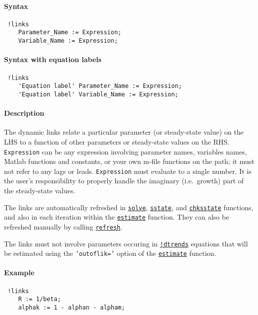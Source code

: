 


	\paragraph{Syntax}
 
 \begin{verbatim}
 !links
    Parameter_Name := Expression;
    Variable_Name := Expression;
 \end{verbatim}
 
 \paragraph{Syntax with equation labels}
 
 \begin{verbatim}
 !links
    'Equation label' Parameter_Name := Expression;
    'Equation label' Variable_Name := Expression;
 \end{verbatim}
 
 \paragraph{Description}
 
 The dynamic links relate a particular parameter (or steady-state value)
 on the LHS to a function of other parameters or steady-state values on
 the RHS. \texttt{Expression} can be any expression involving parameter
 names, variables names, Matlab functions and constants, or your own
 m-file functions on the path; it must not refer to any lags or leads.
 \texttt{Expression} must evaluate to a single number. It is the user's
 responsibility to properly handle the imaginary (i.e.~growth) part of
 the steady-state values.
 
 The links are automatically refreshed in
 \href{model/solve}{\texttt{solve}},
 \href{model/sstate}{\texttt{sstate}}, and
 \href{model/chksstate}{\texttt{chksstate}} functions, and also in each
 iteration within the \href{model/estimate}{\texttt{estimate}} function.
 They can also be refreshed manually by calling
 \href{model/refresh}{\texttt{refresh}}.
 
 The links must not involve parameters occuring in
 \href{modellang/dtrends}{\texttt{!dtrends}} equations that will be
 estimated using the \texttt{'outoflik='} option of the
 \href{model/estimate}{\texttt{estimate}} function.
 
 \paragraph{Example}
 
 \begin{verbatim}
 !links
    R := 1/beta;
    alphak := 1 - alphan - alpham;
 \end{verbatim}


